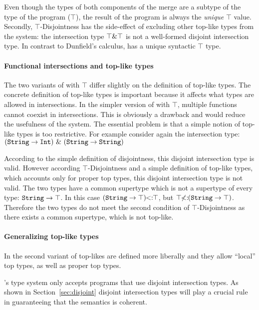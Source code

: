 \noindent Even though the types of both components of the merge are a
subtype of the type of the program ($\top$), the result of the
program is always the \emph{unique} $\top$ value. Secondly,
$\top$-Disjointness has the side-effect of excluding other top-like
types from the system: the intersection type $\top \& \top$ is not
a well-formed disjoint intersection type. In contrast to Dunfield's
calculus, \name has a unique syntactic $\top$ type.

\paragraph{Functional intersections and top-like types}
The two variants of \name with $\top$ differ slightly on the
definition of top-like types. The concrete definition of top-like 
types is important because it affects what types are allowed in intersections.
In the simpler version of \name with $\top$, multiple
functions cannot coexist in intersections. This is obviously a drawback and 
would reduce the usefulness of the system. The essential
problem is that a simple notion of top-like types is too restrictive. 
For example consider again the intersection type: \\

$(\texttt{String} \to \texttt{Int})~\&~(\texttt{String} \to  \texttt{String})$
\vspace{5pt}

\noindent According to the simple definition of disjointness, this disjoint
intersection type is valid. However according $\top$-Disjointness and a simple definition
of top-like types, which accounts only for proper top types, this disjoint intersection type is not valid. 
The two types have a common supertype which is not a supertype of
every type: $\texttt{String} \to \top$. In this case $(\texttt{String} \to
\top)\!\!<:\!\!\top$, but $\top\!\!\not<:\!\!(\texttt{String} \to
\top)$. Therefore the two types do not meet the second condition of
$\top$-Disjointness as there exists a common supertype, which is not top-like.

\paragraph{Generalizing top-like types} In the second variant of \name 
top-likes are defined more liberally and they allow ``local'' top
types, as well as proper top types. 

\name's type system only accepts programs that use disjoint intersection
types. As shown in Section~\ref{sec:disjoint} disjoint intersection types will
play a crucial rule in guaranteeing that the semantics is coherent.




